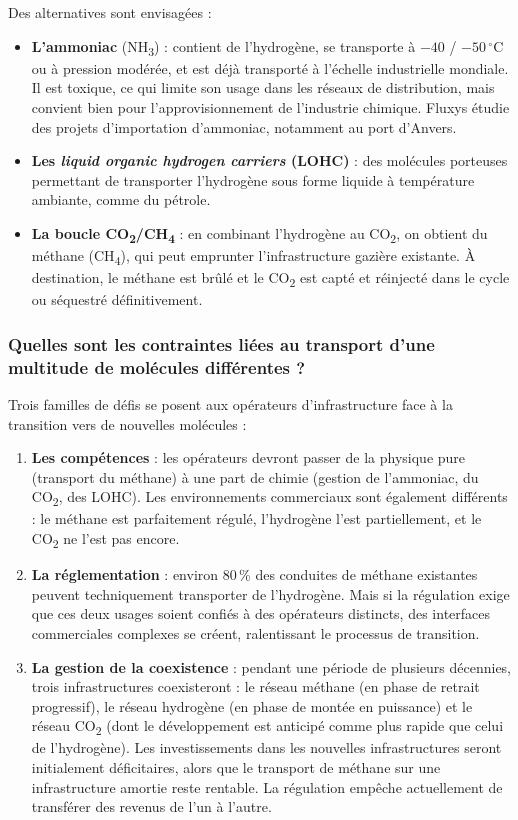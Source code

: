 Des alternatives sont envisagées :
\begin{itemize}
    \item \textbf{L'ammoniac} (NH\textsubscript{3}) : contient de l'hydrogène, se transporte à $-40$ / $-50\,^\circ$C ou à pression modérée, et est déjà transporté à l'échelle industrielle mondiale. Il est toxique, ce qui limite son usage dans les réseaux de distribution, mais convient bien pour l'approvisionnement de l'industrie chimique. Fluxys étudie des projets d'importation d'ammoniac, notamment au port d'Anvers.
    \item \textbf{Les \textit{liquid organic hydrogen carriers} (LOHC)} : des molécules porteuses permettant de transporter l'hydrogène sous forme liquide à température ambiante, comme du pétrole.
    \item \textbf{La boucle CO\textsubscript{2}/CH\textsubscript{4}} : en combinant l'hydrogène au CO\textsubscript{2}, on obtient du méthane (CH\textsubscript{4}), qui peut emprunter l'infrastructure gazière existante. À destination, le méthane est brûlé et le CO\textsubscript{2} est capté et réinjecté dans le cycle ou séquestré définitivement.
\end{itemize}

\subsubsection{Quelles sont les contraintes liées au transport d'une multitude de molécules différentes ?}

Trois familles de défis se posent aux opérateurs d'infrastructure face à la transition vers de nouvelles molécules :

\begin{enumerate}
    \item \textbf{Les compétences} : les opérateurs devront passer de la physique pure (transport du méthane) à une part de chimie (gestion de l'ammoniac, du CO\textsubscript{2}, des LOHC). Les environnements commerciaux sont également différents : le méthane est parfaitement régulé, l'hydrogène l'est partiellement, et le CO\textsubscript{2} ne l'est pas encore.
    \item \textbf{La réglementation} : environ 80\,\% des conduites de méthane existantes peuvent techniquement transporter de l'hydrogène. Mais si la régulation exige que ces deux usages soient confiés à des opérateurs distincts, des interfaces commerciales complexes se créent, ralentissant le processus de transition.
    \item \textbf{La gestion de la coexistence} : pendant une période de plusieurs décennies, trois infrastructures coexisteront : le réseau méthane (en phase de retrait progressif), le réseau hydrogène (en phase de montée en puissance) et le réseau CO\textsubscript{2} (dont le développement est anticipé comme plus rapide que celui de l'hydrogène). Les investissements dans les nouvelles infrastructures seront initialement déficitaires, alors que le transport de méthane sur une infrastructure amortie reste rentable. La régulation empêche actuellement de transférer des revenus de l'un à l'autre.
\end{enumerate}

